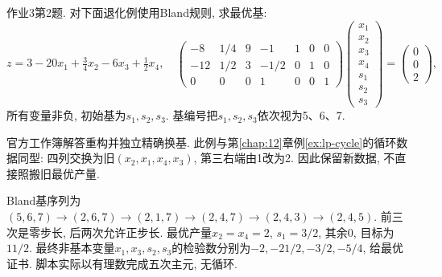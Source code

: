 \begin{exercise}\label{ass:15053-ps3-q2}
作业3第2题. 对下面退化例使用Bland规则, 求最优基:
\[
z=3-20x_1+\tfrac34x_2-6x_3+\tfrac12x_4,
\quad
\begin{pmatrix}-8&1/4&9&-1&1&0&0\\-12&1/2&3&-1/2&0&1&0\\0&0&0&1&0&0&1\end{pmatrix}
\begin{pmatrix}x_1\\x_2\\x_3\\x_4\\s_1\\s_2\\s_3\end{pmatrix}=\begin{pmatrix}0\\0\\2\end{pmatrix},
\]
所有变量非负, 初始基为$s_1,s_2,s_3$. 基编号把$s_1,s_2,s_3$依次视为5、6、7.
\end{exercise}
\begin{solution}
官方工作簿解答重构并独立精确换基. 此例与第\ref{chap:12}章例\ref{ex:lp-cycle}的循环数据同型: 四列交换为旧$(x_2,x_1,x_4,x_3)$, 第三右端由1改为2. 因此保留新数据, 不直接照搬旧最优产量.

Bland基序列为$(5,6,7)\to(2,6,7)\to(2,1,7)\to(2,4,7)\to(2,4,3)\to(2,4,5)$. 前三次是零步长, 后两次允许正步长. 最优产量$x_2=x_4=2$, $s_1=3/2$, 其余0, 目标为$11/2$. 最终非基本变量$x_1,x_3,s_2,s_3$的检验数分别为$-2,-21/2,-3/2,-5/4$, 给最优证书. 脚本实际以有理数完成五次主元, 无循环.
\end{solution}

